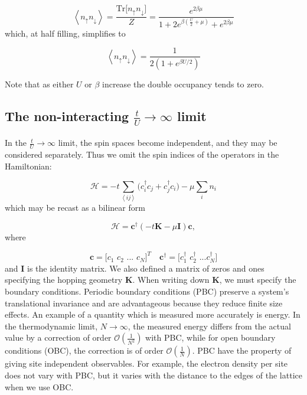 \begin{enumerate}
\begin{equation}
\left\langle n_\uparrow n_\downarrow \right\rangle = \frac{\text{Tr} \big[ n_\uparrow n_\downarrow \big]}{Z} = \frac{e^{2\beta\mu}}{1 + 2 e^{\beta (\frac{U}{2} + \mu )} + e^{2\beta\mu}}
\end{equation}
which, at half filling, simplifies to

\begin{equation}
\left\langle n_\uparrow n_\downarrow \right\rangle = \frac{1}{2 ( 1 + e^{\beta U/2} )}
\end{equation}

Note that as either $U$ or $\beta$ increase the double occupancy tends to zero.
\end{enumerate}

\subsection{The non-interacting $\frac{t}{U} \rightarrow \infty$ limit}\paragraph{}

In the $\frac{t}{U} \rightarrow \infty$ limit, the spin spaces become independent, and they may be considered separately. Thus we omit the spin indices of the operators in the Hamiltonian:

\begin{equation}
\mathcal{H} = -t \sum_{\left\langle i j \right\rangle} \big( c_i^\dagger c_j + c_j^\dagger c_i \big) - \mu \sum_i n_i
\end{equation}
which may be recast as a bilinear form

\begin{equation}
\mathcal{H} = \bm c^\dagger ( -t \bm K - \mu \bm I ) \bm c ,
\end{equation}
where

\begin{equation}
\bm c = \bigg[ c_1 \,\, c_2 \,\, ... \,\, c_N \bigg]^T \quad \bm c^\dagger = \bigg[c_1^\dagger \,\, c_2^\dagger \,\, ... c_N^\dagger \bigg]
\end{equation}
and $\bm I$ is the identity matrix. We also defined a matrix of zeros and ones specifying the hopping geometry $\bm K$. When writing down $\bm K$, we must specify the boundary conditions. Periodic boundary conditions (PBC) preserve a system's translational invariance and are advantageous because they reduce finite size effects. An example of a quantity which is measured more accurately is energy. In the thermodynamic limit, $N \rightarrow \infty$, the measured energy differs from the actual value by a correction of order $\mathcal{O}(\frac{1}{N^2})$ with PBC, while for open boundary conditions (OBC), the correction is of order $\mathcal{O}(\frac{1}{N})$. PBC have the property of giving site independent observables. For example, the electron density per site does not vary with PBC, but it varies with the distance to the edges of the lattice when we use OBC.

